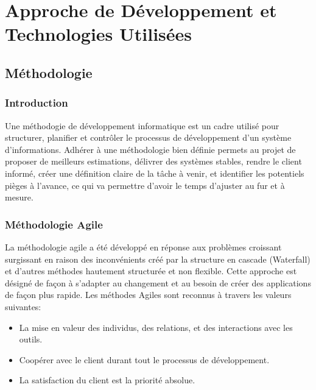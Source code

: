 \documentclass[../main.tex]{subfiles}
\begin{document}
\chapter{Approche de Développement et Technologies Utilisées}
 \section{Méthodologie}
    \subsection{Introduction}
    Une méthodogie de développement informatique est un cadre utilisé pour structurer, planifier et contrôler le processus de développement d'un système d'informations. Adhérer à une méthodologie bien définie permets au projet de proposer de meilleurs estimations, délivrer des systèmes stables, rendre le client informé, créer une définition claire de la tâche à venir, et identifier les potentiels pièges à l'avance, ce qui va permettre d'avoir le temps d'ajuster au fur et à mesure.\cite{dev_methodology}
    
    \subsection{Méthodologie Agile}
    La méthodologie agile a été développé en réponse aux problèmes croissant surgissant en raison des inconvénients créé par la structure en cascade (Waterfall) et d'autres méthodes hautement structurée et non flexible. Cette approche est désigné de façon à s'adapter au changement et au besoin de créer des applications de façon plus rapide. 
    \newline
    Les méthodes Agiles sont reconnus à travers les valeurs suivantes:
    \begin{itemize}
      \item La mise en valeur des individus, des relations, et des interactions avec les outils.  
      \item Coopérer avec le client durant tout le processus de développement. 
      \item La satisfaction du client est la priorité absolue.
    \end{itemize}
\end{document}
